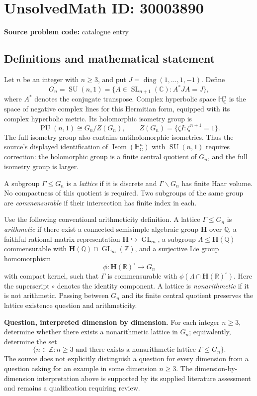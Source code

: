 \documentclass[11pt]{article}
\newcommand{\Z}{\mathbb{Z}}
\newcommand{\Q}{\mathbb{Q}}
\newcommand{\R}{\mathbb{R}}
\newcommand{\C}{\mathbb{C}}
\begin{document}
\section*{UnsolvedMath ID: 30003890}
\textbf{Source problem code:} catalogue entry
\subsection{Definitions and mathematical statement}
Let \(n\) be an integer with \(n\geq 3\), and put \(J=\operatorname{diag}(1,\ldots,1,-1)\). Define
\[
G_n=\operatorname{SU}(n,1)=\{A\in\operatorname{SL}_{n+1}(\C):A^*JA=J\},
\]
where \(A^*\) denotes the conjugate transpose. Complex hyperbolic space \(\mathbb H_{\C}^n\) is the space of negative complex lines for this Hermitian form, equipped with its complex hyperbolic metric. Its holomorphic isometry group is
\[
\operatorname{PU}(n,1)\cong G_n/Z(G_n),\qquad
Z(G_n)=\{\zeta I:\zeta^{n+1}=1\}.
\]
The full isometry group also contains antiholomorphic isometries. Thus the source's displayed identification of \(\operatorname{Isom}(\mathbb H_{\C}^n)\) with \(\operatorname{SU}(n,1)\) requires correction: the holomorphic group is a finite central quotient of \(G_n\), and the full isometry group is larger.

A subgroup \(\Gamma\leq G_n\) is a \emph{lattice} if it is discrete and \(\Gamma\backslash G_n\) has finite Haar volume. No compactness of this quotient is required. Two subgroups of the same group are \emph{commensurable} if their intersection has finite index in each.

Use the following conventional arithmeticity definition. A lattice \(\Gamma\leq G_n\) is \emph{arithmetic} if there exist a connected semisimple algebraic group \(\mathbf H\) over \(\Q\), a faithful rational matrix representation \(\mathbf H\hookrightarrow\operatorname{GL}_m\), a subgroup \(\Lambda\leq\mathbf H(\Q)\) commensurable with \(\mathbf H(\Q)\cap\operatorname{GL}_m(\Z)\), and a surjective Lie group homomorphism
\[
\phi:\mathbf H(\R)^\circ\longrightarrow G_n
\]
with compact kernel, such that \(\Gamma\) is commensurable with \(\phi(\Lambda\cap\mathbf H(\R)^\circ)\). Here the superscript \(\circ\) denotes the identity component. A lattice is \emph{nonarithmetic} if it is not arithmetic. Passing between \(G_n\) and its finite central quotient preserves the lattice existence question and arithmeticity.

\textbf{Question, interpreted dimension by dimension.} For each integer \(n\geq3\), determine whether there exists a nonarithmetic lattice in \(G_n\); equivalently, determine the set
\[
\bigl\{n\in\Z:n\geq3\text{ and there exists a nonarithmetic lattice }\Gamma\leq G_n\bigr\}.
\]
The source does not explicitly distinguish a question for every dimension from a question asking for an example in some dimension \(n\geq3\). The dimension-by-dimension interpretation above is supported by its supplied literature assessment and remains a qualification requiring review.
\end{document}
